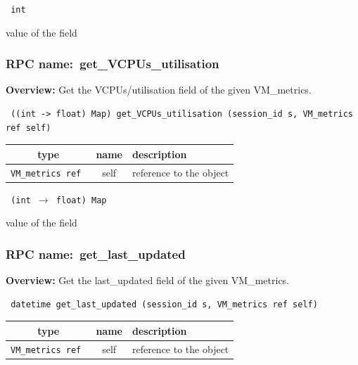 \vspace{0.3cm}

{\tt 
int
}


value of the field
\vspace{0.3cm}
\vspace{0.3cm}
\vspace{0.3cm}
\subsubsection{RPC name:~get\_VCPUs\_utilisation}

{\bf Overview:} 
Get the VCPUs/utilisation field of the given VM\_metrics.

\begin{verbatim} ((int -> float) Map) get_VCPUs_utilisation (session_id s, VM_metrics ref self)\end{verbatim}



 
\vspace{0.3cm}
\begin{tabular}{|c|c|p{7cm}|}
 \hline
{\bf type} & {\bf name} & {\bf description} \\ \hline
{\tt VM\_metrics ref } & self & reference to the object \\ \hline 

\end{tabular}

\vspace{0.3cm}

{\tt 
(int $\rightarrow$ float) Map
}


value of the field
\vspace{0.3cm}
\vspace{0.3cm}
\vspace{0.3cm}
\subsubsection{RPC name:~get\_last\_updated}

{\bf Overview:} 
Get the last\_updated field of the given VM\_metrics.

\begin{verbatim} datetime get_last_updated (session_id s, VM_metrics ref self)\end{verbatim}



 
\vspace{0.3cm}
\begin{tabular}{|c|c|p{7cm}|}
 \hline
{\bf type} & {\bf name} & {\bf description} \\ \hline
{\tt VM\_metrics ref } & self & reference to the object \\ \hline 

\end{tabular}

